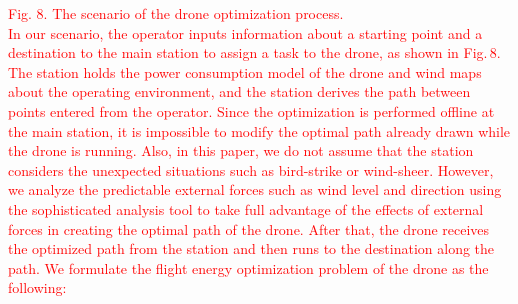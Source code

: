 \documentclass[onecolumn]{IEEEconf}
\begin{document}
\begin{description}
\begin{mdframed}[ linewidth=.75pt, userdefinedwidth=0.9\textwidth]
    \textcolor{red}{Fig. 8. The scenario of the drone optimization process.}~\\
    \justify\textcolor{red}{In our scenario, the operator inputs information about a starting point and a destination to the main station to assign a task to the drone, as shown in Fig.\,8.
    The station holds the power consumption model of the drone and wind maps about the operating environment, and the station derives the path between points entered from the operator.
    Since the optimization is performed offline at the main station, it is impossible to modify the optimal path already drawn while the drone is running. Also, in this paper, we do not assume that the station considers the unexpected situations such as bird-strike or wind-sheer.
    However, we analyze the predictable external forces such as wind level and direction using the sophisticated analysis tool to take full advantage of the effects of external forces in creating the optimal path of the drone. 
    After that, the drone receives the optimized path from the station and then runs to the destination along the path. We formulate the flight energy optimization problem of the drone as the following:}


\end{mdframed}
\end{description}
\end{document}
